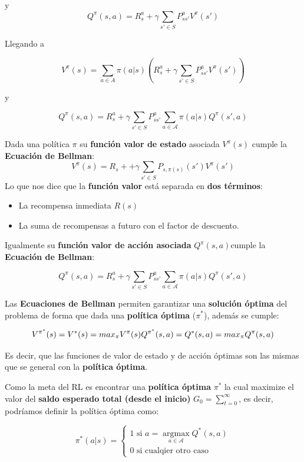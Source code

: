 \documentclass[
  a4paper,
  DIV=11,
  numbers=noendperiod]{scrreprt}
\providecommand{\tightlist}{%
  \setlength{\itemsep}{0pt}\setlength{\parskip}{0pt}}\usepackage{longtable,booktabs,array}
\begin{document}
y \[
Q^\pi(s,a) = R_s^a+\gamma \sum_{s'\in S} P_{ss'}^{a}V^\pi(s')
\]

Llegando a

\[
V^\pi(s) = \sum_{a\in A}\pi(a|s)(R_s^a+\gamma \sum_{s'\in S} P_{ss'}^{a}V^\pi(s'))
\]

y

\[
Q^\pi(s,a) = R_s^a+\gamma \sum_{s'\in S} P_{ss'}^{a}\sum_{a \in \mathcal A} \pi (a|s)Q^\pi(s',a)
\]

Dada una política \(\pi\) su \textbf{función valor de estado} asociada
\(V^{\pi}(s)\) cumple la \textbf{Ecuación de Bellman}:
\[V^{\pi}(s)=R_s+ + \gamma\sum_{s'\in S}P_{s,\pi(s)}(s')V^{\pi}(s')\] Lo
que nos dice que la \textbf{función valor} está separada en \textbf{dos
términos}:

\begin{itemize}
\tightlist
\item
  La recompensa inmediata \(R(s)\)
\item
  La suma de recompensas a futuro con el factor de descuento.
\end{itemize}

Igualmente su \textbf{función valor de acción asociada}
\(Q^\pi(s,a)\)cumple la \textbf{Ecuación de Bellman}:

\[
Q^\pi(s,a) = R_s^a+\gamma \sum_{s'\in S} P_{ss'}^{a}\sum_{a \in \mathcal A} \pi (a|s)Q^\pi(s',a)
\]

Las \textbf{Ecuaciones de Bellman} permiten garantizar una
\textbf{solución óptima} del problema de forma que dada una
\textbf{política óptima} (\(\pi^*\)), además se cumple:

\[
V^{\pi^*}(s)=V^*(s)=max_\pi V^\pi(s)\\
Q^{\pi^*}(s,a)=Q^*(s,a)=max_\pi Q^\pi(s,a)
\]

Es decir, que las funciones de valor de estado y de acción óptimas son
las mismas que se general con la \textbf{política óptima}.

Como la meta del RL es encontrar una \textbf{política óptima} \(\pi^*\)
la cual maximize el valor del \textbf{saldo esperado total (desde el
inicio)} \(G_0=\sum_{t=0}^\infty\), es decir, podríamos definir la
política óptima como:

\begin{equation}
\pi^*(a|s)= \left\lbrace
\begin{array}{ll}
1 \text{ si } a=\mathop{\mathrm{argmax}}\limits_{a \in \mathcal A} Q^* (s,a) \\
0 \text{ si cualqier otro caso} 
\end{array}
\right.
\end{equation}
\end{document}
